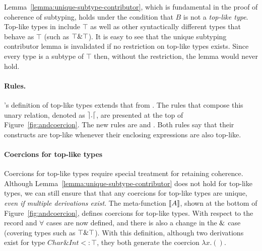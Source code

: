 Lemma~\ref{lemma:unique-subtype-contributor}, which is fundamental in
the proof of coherence of subtyping, holds under the condition
that $B$ is not a \emph{top-like type}. Top-like types in \name
include $\top$ as well as other syntactically different types that
behave as $\top$ (such as $\top \& \top$). It is easy to see that the unique
subtyping contributor lemma is invalidated if no restriction on
top-like types exists. Since every type is a subtype of $\top$ 
then, without the restriction, the lemma would never hold.

\paragraph{Rules.}
\name's definition of top-like types extends that from \oldname.  The
rules that compose this unary relation, denoted as $\rceil  .  \lceil$,
are presented at the top of Figure~\ref{fig:andcoercion}.  
The new rules are  and
. 
Both rules say that their constructs are top-like whenever their enclosing
expressions are also top-like.

\paragraph{Coercions for top-like types} Coercions for top-like types 
require special treatment for retaining coherence. Although Lemma~\ref{lemma:unique-subtype-contributor}
does not hold for top-like types, we can still ensure that that any 
coercions for top-like types are unique, \emph{even if multiple
  derivations exist}. The meta-function
$\llbracket A \rrbracket$, shown at the bottom of Figure~\ref{fig:andcoercion},
 defines coercions for top-like types. With respect to \oldname the record and $\forall$ cases
are now defined, and there is also a change in the $\&$ case (covering types such as $\top
\& \top$). With this definition, although two derivations
exist for type $Char\&Int <: \top$, they both generate the coercion 
$\lambda x . ()$.
 
